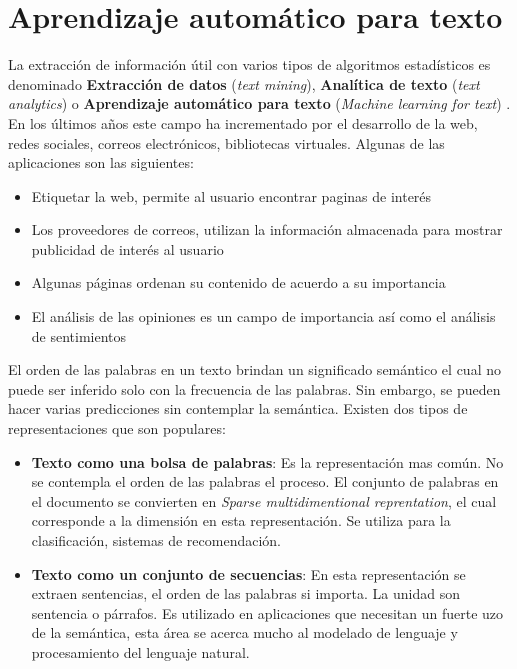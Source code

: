 
\section[AA Para texto]{Aprendizaje automático para texto}

La extracción de información útil con varios tipos de algoritmos estadísticos es denominado \textbf{Extracción de datos} (\textit{text mining}), \textbf{Analítica de texto} (\textit{text analytics}) o \textbf{Aprendizaje automático para texto} (\textit{Machine learning for text}) \citep{CD1}. En los últimos años este campo ha incrementado por el desarrollo de la web, redes sociales, correos electrónicos, bibliotecas virtuales. Algunas de las aplicaciones son las siguientes:

\begin{itemize}

	\item Etiquetar la web, permite al usuario encontrar paginas de interés

	\item Los proveedores de correos, utilizan la información almacenada para mostrar publicidad de interés al usuario

	\item Algunas páginas ordenan su contenido de acuerdo a su importancia

	\item El análisis de las opiniones es un campo de importancia así como el análisis de sentimientos		

\end{itemize}

El orden de las palabras en un texto brindan un significado semántico el cual no puede ser inferido  solo con la frecuencia de las palabras. Sin embargo, se pueden hacer varias predicciones sin contemplar la semántica. Existen dos tipos de representaciones que son populares:

\begin{itemize}
	
	\item \textbf{Texto como una bolsa de palabras}: Es la representación mas común. No se contempla el orden de las palabras el proceso. El conjunto de palabras en el documento se convierten en \textit{Sparse multidimentional reprentation}, el cual corresponde a la dimensión en esta representación. Se utiliza para la clasificación, sistemas de recomendación.

	\item \textbf{Texto como un conjunto de secuencias}: En esta representación se extraen sentencias, el orden de las palabras si importa. La unidad son sentencia o párrafos. Es utilizado en aplicaciones que necesitan un fuerte uzo de la semántica, esta área se acerca mucho al modelado de lenguaje y procesamiento del lenguaje natural.

\end{itemize}


